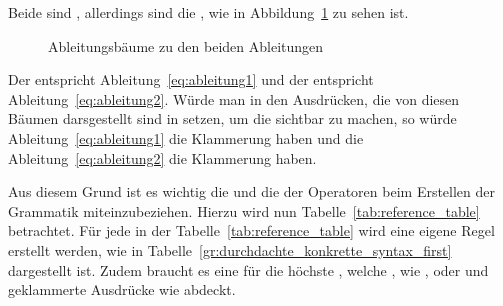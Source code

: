 Beide  sind , allerdings sind die , wie in Abbildung~\ref{fig:ableitungsbäume_zu_den_beiden_ableitungen} zu sehen ist.

\begin{figure}[H]
\begin{transformation}
  \notequal
\end{transformation}
\caption{Ableitungsbäume zu den beiden Ableitungen}
\label{fig:ableitungsbäume_zu_den_beiden_ableitungen}
\end{figure}

Der  entspricht Ableitung~\ref{eq:ableitung1} und der  entspricht Ableitung~\ref{eq:ableitung2}. Würde man in den Ausdrücken, die von diesen Bäumen darsgestellt sind in  setzen, um die  sichtbar zu machen, so würde Ableitung~\ref{eq:ableitung1} die Klammerung  haben und die Ableitung~\ref{eq:ableitung2} die Klammerung  haben.

Aus diesem Grund ist es wichtig die  und die  der Operatoren beim Erstellen der Grammatik miteinzubeziehen. Hierzu wird nun Tabelle~\ref{tab:reference_table} betrachtet. Für jede  in der Tabelle~\ref{tab:reference_table} wird eine eigene Regel erstellt werden, wie in Tabelle~\ref{gr:durchdachte_konkrette_syntax_first} dargestellt ist. Zudem braucht es eine   für die höchste , welche , wie ,    oder  und geklammerte Ausdrücke wie  abdeckt.

\begin{grammar}
  \toprule
  \midrule
  \midrule
  \bottomrule
\end{grammar}

